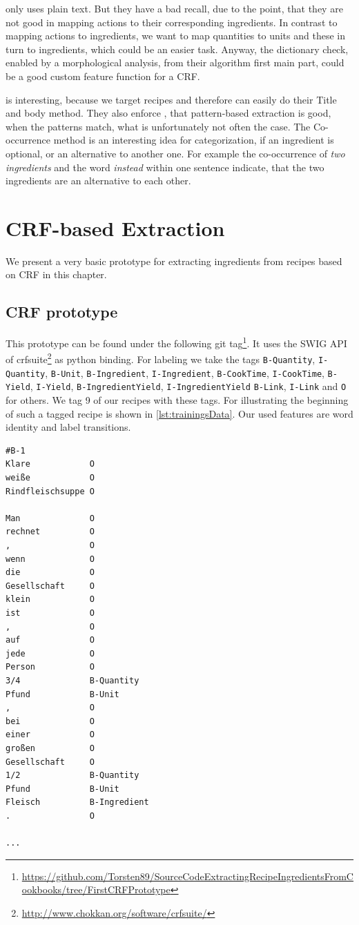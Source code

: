\documentclass[12pt, twoside]{report}
\begin{document}
\parencite{GrammaBased} only uses plain text. But they have a bad recall, due to the point, that they are not good in mapping actions to their corresponding ingredients. In contrast to mapping actions to ingredients, we want to map quantities to units and these in turn to ingredients, which could be an easier task. Anyway, the dictionary check, enabled by a morphological analysis, from their algorithm first main part, could be a good  custom feature function for a CRF.

\parencite{konvens07_wiegand12o} is interesting, because we target recipes and therefore can easily do their Title and body method. They also enforce \parencite{GrammaBased}, that pattern-based extraction is good, when the patterns match, what is unfortunately not often the case. The Co-occurrence method is an interesting idea for categorization, if an ingredient is optional, or an alternative to another one. For example the co-occurrence of \textit{two ingredients} and the word \textit{instead} within one sentence indicate, that the two ingredients are an alternative to each other.



\chapter{CRF-based Extraction}
We present a very basic prototype for extracting ingredients from recipes based on CRF in this chapter.

\section{CRF prototype}
This prototype can be found under the following git tag\footnote{\url{https://github.com/Torsten89/SourceCodeExtractingRecipeIngredientsFromCookbooks/tree/FirstCRFPrototype}}. It uses the SWIG API of crfsuite\footnote{\url{http://www.chokkan.org/software/crfsuite/}} as python binding. For labeling we take the tags \texttt{B-Quantity}, \texttt{I-Quantity}, \texttt{B-Unit}, \texttt{B-Ingredient}, \texttt{I-Ingredient}, \texttt{B-CookTime}, \texttt{I-CookTime},
\texttt{B-Yield}, \texttt{I-Yield}, \texttt{B-IngredientYield}, \texttt{I-IngredientYield}
\texttt{B-Link}, \texttt{I-Link} and \texttt{O} for others. We tag 9 of our recipes with these tags. For illustrating the beginning of such a tagged recipe is shown in \cref{lst:trainingsData}. Our used features are word identity and label transitions.

\begin{lstlisting}[caption={Trainings data}, label=lst:trainingsData]
#B-1
Klare            O
weiße            O
Rindfleischsuppe O

Man	             O
rechnet	         O
,                O
wenn             O
die	             O
Gesellschaft     O
klein            O
ist              O
,                O
auf              O
jede             O
Person           O
3/4	             B-Quantity
Pfund            B-Unit
,                O
bei              O
einer            O
großen           O
Gesellschaft     O
1/2	             B-Quantity
Pfund            B-Unit
Fleisch          B-Ingredient
.                O

...
\end{lstlisting}
\end{document}

